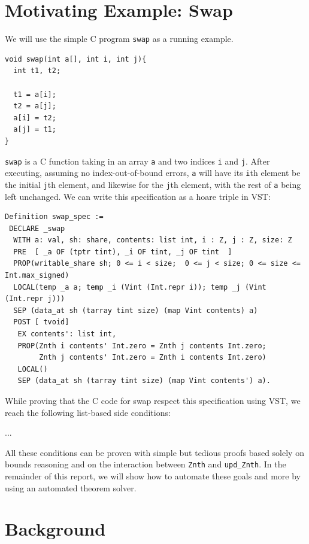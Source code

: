 \documentclass[onecolumn, preprint]{sigplanconf}
\begin{document}
\section{Motivating Example: Swap}

We will use the simple C program \lstinline|swap| as a running example.

\begin{lstlisting}
void swap(int a[], int i, int j){
  int t1, t2;

  t1 = a[i];
  t2 = a[j];
  a[i] = t2;
  a[j] = t1;
}
\end{lstlisting}

\lstinline|swap| is a C function taking in an array \lstinline|a| and two indices \lstinline|i| and \lstinline|j|. After executing, assuming no index-out-of-bound errors, \lstinline|a| will have its \lstinline|i|th element be the initial \lstinline|j|th element, and likewise for the \lstinline|j|th element, with the rest of \lstinline|a| being left unchanged. We can write this specification as a hoare triple in VST:
\begin{lstlisting}
Definition swap_spec :=
 DECLARE _swap
  WITH a: val, sh: share, contents: list int, i : Z, j : Z, size: Z
  PRE  [ _a OF (tptr tint), _i OF tint, _j OF tint  ]
  PROP(writable_share sh; 0 <= i < size;  0 <= j < size; 0 <= size <= Int.max_signed)
  LOCAL(temp _a a; temp _i (Vint (Int.repr i)); temp _j (Vint (Int.repr j)))
  SEP (data_at sh (tarray tint size) (map Vint contents) a)
  POST [ tvoid]
   EX contents': list int,
   PROP(Znth i contents' Int.zero = Znth j contents Int.zero;
        Znth j contents' Int.zero = Znth i contents Int.zero)
   LOCAL()
   SEP (data_at sh (tarray tint size) (map Vint contents') a).
\end{lstlisting}

While proving that the C code for swap respect this specification using VST, we reach the following list-based side conditions:

...

All these conditions can be proven with simple but tedious proofs based solely on bounds reasoning and on the interaction between \lstinline|Znth| and \lstinline|upd_Znth|. In the remainder of this report, we will show how to automate these goals and more by using an automated theorem solver.



\section{Background}
\end{document}

